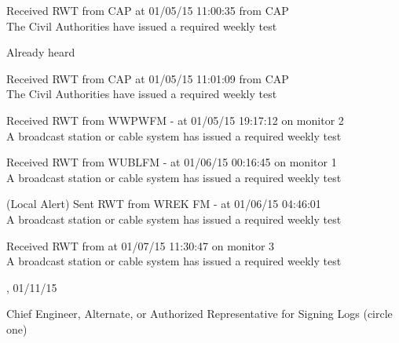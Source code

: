 \documentclass{article}
\begin{document}
\medskip

\hspace{20 pt}     Received RWT from CAP at 01/05/15 11:00:35 from CAP \\\hspace{20pt}     The Civil Authorities have issued a required weekly test

\medskip



\medskip

\medskip

 \hspace{20 pt}Already heard 

\medskip

\hspace{20 pt}     Received RWT from CAP at 01/05/15 11:01:09 from CAP \\\hspace{20pt}     The Civil Authorities have issued a required weekly test

\medskip

\hspace{20 pt}     Received RWT from WWPWFM - at 01/05/15 19:17:12 on monitor 2\\\hspace{20pt}     A broadcast station or cable system has issued a required weekly test

\medskip

\hspace{20 pt}     Received RWT from WUBLFM - at 01/06/15 00:16:45 on monitor 1\\\hspace{20pt}     A broadcast station or cable system has issued a required weekly test

\medskip

\hspace{20 pt}     (Local Alert) Sent RWT from WREK FM - at 01/06/15 04:46:01\\\hspace{20pt}     A broadcast station or cable system has issued a required weekly test

\medskip

\hspace{20 pt}     Received RWT from  at 01/07/15 11:30:47 on monitor 3\\\hspace{20pt}     A broadcast station or cable system has issued a required weekly test

\medskip


 \underline{\hspace{100 pt}}, 01/11/15

\medskip

{\large{Chief Engineer, Alternate, or Authorized  Representative for Signing Logs \newline (circle one)}} 

\medskip

 \noindent 

\medskip
\end{document}

